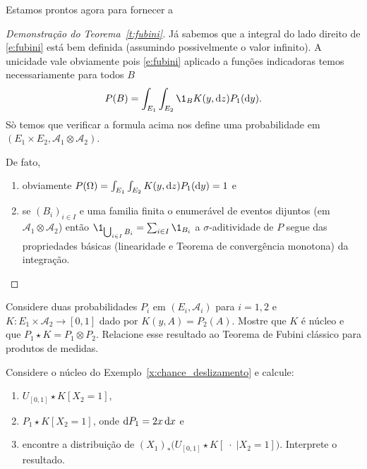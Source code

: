 Estamos prontos agora para fornecer a
\begin{proof}[Demonstração do Teorema~\ref{t:fubini}]
  Já sabemos que a integral do lado direito de \eqref{e:fubini} está bem definida (assumindo possivelmente o valor infinito).
  A unicidade vale obviamente pois \eqref{e:fubini} aplicado a funções indicadoras temos necessariamente para todos $B$
\begin{equation}
    P(B) = \int_{E_1} \int_{E_2} \1_{B} K(y, \d z) P_1 (\d y).
  \end{equation}
  Sò temos que verificar a formula acima nos define uma probabilidade em $(E_1 \times E_2, \mathcal{A}_1 \otimes \mathcal{A}_2)$.

  De fato,
  \begin{enumerate}[\quad a)]
  \item obviamente $P(\Omega) = \int_{E_1} \int_{E_2}  K(y, \mathop{}\!\mathrm{d} z) P_1(\mathop{}\!\mathrm{d} y) = 1$ e
  \item se $(B_i)_{i\in I}$ e uma familia finita o enumerável de eventos dijuntos (em $\mathcal{A}_1 \otimes \mathcal{A}_2$) então 
  $\1_{\bigcup_{i\in I} B_i}=\sum_{i\in I} \1_{B_i}$ a $\sigma$-aditividade de $P$ segue das propriedades básicas 
  (linearidade e Teorema de convergência monotona) da integração.
  \end{enumerate}
\end{proof}

\begin{exercise}
  \label{x:nucleo_constante}
  Considere duas probabilidades $P_i$ em $(E_i, \mathcal{A}_i)$ para $i = 1,2$ e $K:E_1 \times \mathcal{A}_2 \to [0,1]$ dado por $K(y,A) = P_2(A)$.
  Mostre que $K$ é núcleo e que $P_1 \star K = P_1 \otimes P_2$.
  Relacione esse resultado ao Teorema de Fubini clássico para produtos de medidas.
\end{exercise}

\begin{exercise}
  Considere o núcleo do Exemplo~\ref{x:chance_deslizamento} e calcule:
  \begin{enumerate}[\quad a)]
  \item $U_{[0,1]} \star K [X_2 = 1]$,
  \item $P_1 \star K [X_2 = 1]$, onde $\mathop{}\!\mathrm{d} P_1 = 2x \mathop{}\!\mathrm{d} x$ e
  \item encontre a distribuição de $(X_1)_* \big( U_{[0,1]} \star K [\; \cdot \; | X_2 = 1] \big)$. Interprete o resultado.
  \end{enumerate}
\end{exercise}

